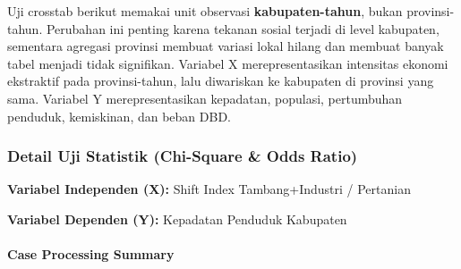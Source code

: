 \documentclass[
]{article}
\begin{document}
Uji crosstab berikut memakai unit observasi \textbf{kabupaten-tahun},
bukan provinsi-tahun. Perubahan ini penting karena tekanan sosial
terjadi di level kabupaten, sementara agregasi provinsi membuat variasi
lokal hilang dan membuat banyak tabel menjadi tidak signifikan. Variabel
X merepresentasikan intensitas ekonomi ekstraktif pada provinsi-tahun,
lalu diwariskan ke kabupaten di provinsi yang sama. Variabel Y
merepresentasikan kepadatan, populasi, pertumbuhan penduduk, kemiskinan,
dan beban DBD.

\subsubsection{Detail Uji Statistik (Chi-Square \& Odds
Ratio)}\label{detail-uji-statistik-chi-square-odds-ratio}

\textbf{Variabel Independen (X):} Shift Index Tambang+Industri /
Pertanian

\textbf{Variabel Dependen (Y):} Kepadatan Penduduk Kabupaten

\paragraph{Case Processing Summary}\label{case-processing-summary}
\end{document}
